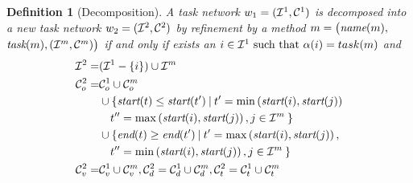 \documentclass[letterpaper]{article} %
\newtheorem{definition}{Definition}
\newcommand{\name}{\text{\it name}}
\newcommand{\tstart}{\text{\it start}}
\newcommand{\tend}{\text{\it end}}
\newcommand{\task}{\text{\it task}}
\begin{document}

\begin{definition}[Decomposition]\label{def:decomp}
  A task network $w_1= ({\cal{I}}^1, {\cal{C}}^{1})$ is decomposed into a new task network
  $w_2= ({\cal{I}}^2, {\cal{C}}^{2})$ by refinement by a method $m = \bigl(\name(m),$ $\task(m), ({\cal{I}}^m, {\cal{C}}^{m})\bigr)$ 
  if and only if exists an $i \in {\cal{I}}^1 \text{ such that } \alpha(i) = task(m)$ and
\begin{equation*} \label{eq1}
\begin{aligned}
{\cal{I}}^2 = & ({\cal{I}}^1 - \{i\}) \cup {\cal{I}}^m\\
{\cal{C}}^{2}_{o} = & {\cal{C}}^{1}_{o} \cup {\cal{C}}^{m}_{o} \\
& \cup \{ \tstart(t) \leq \tstart(t') \: | \: t'= \min\left(\tstart(i),\tstart(j)\right)\\
&\quad t''= \max\left(\tstart(i),\tstart(j)\right), j \in {\cal{I}}^m \:  \}  \\
& \cup \{ \tend(t) \geq \tend(t') \: | \: t'= \max\left(\tstart(i),\tstart(j)\right),\\
& \quad t''= \min\left(\tstart(i),\tstart(j)\right), j \in {\cal{I}}^m \:  \}\\
{\cal{C}}^{2}_{v}  = & {\cal{C}}^{1}_{v} \cup {\cal{C}}^{m}_{v}, 
{\cal{C}}^{2}_{d}  =  {\cal{C}}^{1}_{d} \cup {\cal{C}}^{m}_{d}, 
{\cal{C}}^{2}_{t}  =  {\cal{C}}^{1}_{t} \cup {\cal{C}}^{m}_{t} \\
\end{aligned}
\end{equation*}
\end{definition}
\end{document}
